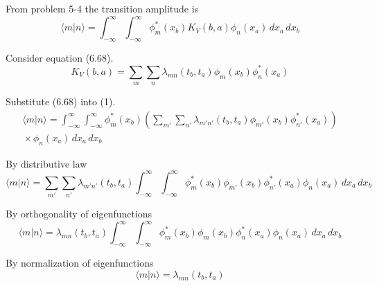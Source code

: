 


From problem 5-4 the transition amplitude is
\begin{equation*}
\langle m|n\rangle=
\int_{-\infty}^\infty\int_{-\infty}^\infty
\phi_m^*(x_b)K_V(b,a)\phi_n(x_a)
\,dx_a\,dx_b
\tag{1}
\end{equation*}

Consider equation (6.68).
\begin{equation*}
K_V(b,a)=\sum_m\sum_n\lambda_{mn}(t_b,t_a)\phi_m(x_b)\phi_n^*(x_a)
\tag{6.68}
\end{equation*}

Substitute (6.68) into (1).
\begin{multline*}
\langle m|n\rangle=
\int_{-\infty}^\infty\int_{-\infty}^\infty
\phi_m^*(x_b)
\left(\sum_{m'}\sum_{n'}\lambda_{m'n'}(t_b,t_a)\phi_{m'}(x_b)\phi_{n'}^*(x_a)\right)
\\
{}\times
\phi_n(x_a)
\,dx_a\,dx_b
\end{multline*}

By distributive law
\begin{equation*}
\langle m|n\rangle=
\sum_{m'}\sum_{n'}\lambda_{m'n'}(t_b,t_a)
\int_{-\infty}^\infty\int_{-\infty}^\infty
\phi_m^*(x_b)\phi_{m'}(x_b)
\phi_{n'}^*(x_a)\phi_n(x_a)
\,dx_a\,dx_b
\end{equation*}

By orthogonality of eigenfunctions
\begin{equation*}
\langle m|n\rangle=
\lambda_{mn}(t_b,t_a)\int_{-\infty}^\infty\int_{-\infty}^\infty
\phi_m^*(x_b)\phi_m(x_b)
\phi_n^*(x_a)\phi_n(x_a)
\,dx_a\,dx_b
\end{equation*}

By normalization of eigenfunctions
\begin{equation*}
\langle m|n\rangle=
\lambda_{mn}(t_b,t_a)
\end{equation*}


